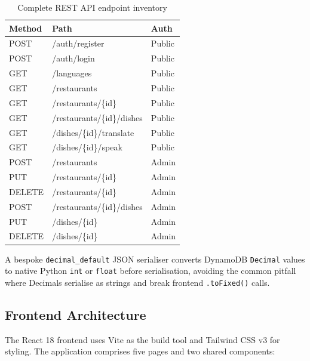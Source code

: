 \documentclass[conference]{IEEEtran}
\begin{document}
\begin{table}[H]
\centering
\caption{Complete REST API endpoint inventory}
\begin{tabular}{lll}
\toprule
\textbf{Method} & \textbf{Path} & \textbf{Auth} \\
\midrule
POST & /auth/register              & Public \\
POST & /auth/login                 & Public \\
GET  & /languages                  & Public \\
GET  & /restaurants                & Public \\
GET  & /restaurants/\{id\}         & Public \\
GET  & /restaurants/\{id\}/dishes  & Public \\
GET  & /dishes/\{id\}/translate    & Public \\
GET  & /dishes/\{id\}/speak        & Public \\
POST & /restaurants                & Admin  \\
PUT  & /restaurants/\{id\}         & Admin  \\
DELETE & /restaurants/\{id\}       & Admin  \\
POST & /restaurants/\{id\}/dishes  & Admin  \\
PUT  & /dishes/\{id\}              & Admin  \\
DELETE & /dishes/\{id\}            & Admin  \\
\bottomrule
\end{tabular}
\end{table}

A bespoke \texttt{decimal\_default} JSON serialiser converts DynamoDB \texttt{Decimal} values to native Python \texttt{int} or \texttt{float} before serialisation, avoiding the common pitfall where Decimals serialise as strings and break frontend \texttt{.toFixed()} calls.

\subsection{Frontend Architecture}

The React 18 frontend uses Vite as the build tool and Tailwind CSS v3 for styling. The application comprises five pages and two shared components:
\end{document}
